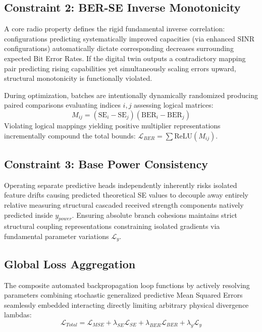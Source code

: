 \documentclass[conference]{IEEEtran}
\begin{document}
\subsection{Constraint 2: BER-SE Inverse Monotonicity}
A core radio property defines the rigid fundamental inverse correlation: configurations predicting systematically improved capacities (via enhanced SINR configurations) automatically dictate corresponding decreases surrounding expected Bit Error Rates. If the digital twin outputs a contradictory mapping pair predicting rising capabilities yet simultaneously scaling errors upward, structural monotonicity is functionally violated.

During optimization, batches are intentionally dynamically randomized producing paired comparisons evaluating indices $i, j$ assessing logical matrices:
\begin{equation}
M_{ij} = (\text{SE}_i - \text{SE}_j)(\text{BER}_i - \text{BER}_j)
\end{equation}
Violating logical mappings yielding positive multiplier representations incrementally compound the total bounds: $\mathcal{L}_{BER} = \sum \text{ReLU}(M_{ij})$.

\subsection{Constraint 3: Base Power Consistency}
Operating separate predictive heads independently inherently risks isolated feature drifts causing predicted theoretical SE values to decouple away entirely relative measuring structural cascaded received strength components natively predicted inside $y_{power}$. Ensuring absolute branch cohesions maintains strict structural coupling representations constraining isolated gradients via fundamental parameter variations $\mathcal{L}_y$.

\subsection{Global Loss Aggregation}
The composite automated backpropagation loop functions by actively resolving parameters combining stochastic generalized predictive Mean Squared Errors seamlessly embedded interacting directly limiting arbitrary physical divergence lambdas:
\begin{equation}
\mathcal{L}_{Total} = \mathcal{L}_{MSE} + \lambda_{SE}\mathcal{L}_{SE} + \lambda_{BER}\mathcal{L}_{BER} + \lambda_{y}\mathcal{L}_{y}
\end{equation} 
\end{document}
